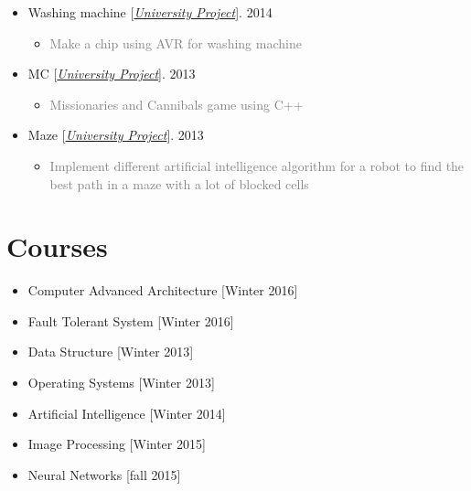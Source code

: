 \documentclass[10pt,a4paper,sans]{moderncv} %
\begin{document}
\begin{itemize}
		\item Washing machine [\href{https://sbu.ac.ir/Cols/CSE/Pages/default.aspx/}{\emph{University Project}}]. \hfill 2014
		\begin{itemize}
			\item \textcolor{gray} {Make a chip using AVR for washing machine}
		\end{itemize}

		\item MC [\href{https://sbu.ac.ir/Cols/CSE/Pages/default.aspx/}{\emph{University Project}}]. \hfill 2013
		\begin{itemize}
			\item \textcolor{gray} {Missionaries and Cannibals game using C++}
		\end{itemize}

		\item Maze [\href{https://sbu.ac.ir/Cols/CSE/Pages/default.aspx/}{\emph{University Project}}]. \hfill 2013
		\begin{itemize}
			\item \textcolor{gray} {Implement different artificial intelligence algorithm for a robot to find the best path in a maze with a lot of blocked cells}
		\end{itemize}


	\end{itemize}


	\section{Courses}
	\begin{multicols}{2}
		\begin{itemize}
			\item {} Computer Advanced Architecture \hfill[Winter 2016]
			\item {} Fault Tolerant System \hfill[Winter 2016]
			\item {} Data Structure \hfill[Winter 2013]
			\item {} Operating Systems \hfill[Winter 2013]
			\item {} Artificial Intelligence \hfill[Winter 2014]
			\item {} Image Processing \hfill[Winter 2015]
			\item {} Neural Networks \hfill[fall 2015]
			
		\end{itemize}
	\end{multicols}
	
\end{document}

